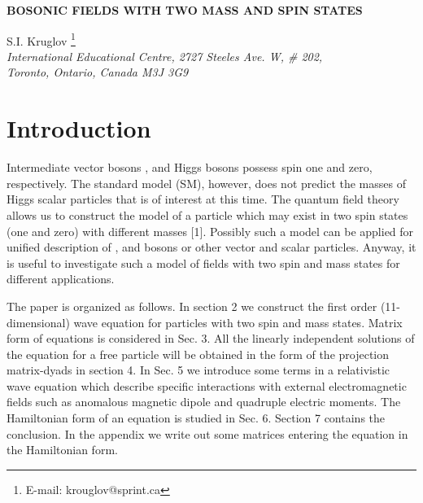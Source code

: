 \documentclass[a4paper,12pt]{article}
\begin{document}
\begin{center}
{\bf BOSONIC FIELDS WITH TWO MASS AND SPIN STATES}

\vspace{5mm}
 S.I. Kruglov \footnote{E-mail:
krouglov@sprint.ca}\\

\vspace{5mm}
\textit{International Educational Centre, 2727 Steeles Ave. W, \# 202, \\
Toronto, Ontario, Canada M3J 3G9}
\end{center}

\begin{abstract}
We consider the bosonic fields which describe a particle which may
exist in states with spins one and zero with different masses. All
the linearly independent solutions of the equation for a free
particle are obtained in the form of the projection matrix-dyads
(density-matrices). The interaction with anomalous magnetic dipole
and quadruple electric moments of a particle is studied. The
Hamiltonian form of the first order equation has been
investigated.
\end{abstract}

\section{Introduction}

Intermediate vector bosons \coordHE{}, \coordHE{} and Higgs \coordHE{} bosons
possess spin one and zero, respectively. The standard model (SM),
however, does not predict the masses of Higgs scalar particles
that is of interest at this time. The quantum field theory allows
us to construct the model of a particle which may exist in two
spin states (one and zero) with different masses [1]. Possibly
such a model can be applied for unified description of \coordHE{},
\coordHE{} and \coordHE{} bosons or other vector and scalar particles. Anyway,
it is useful to investigate such a model of fields with two spin
and mass states for different applications.

The paper is organized as follows. In section 2 we construct the
first order (11-dimensional) wave equation for particles with two
spin and mass states. Matrix form of equations is considered in
Sec. 3. All the linearly independent solutions of the equation for
a free particle will be obtained in the form of the projection
matrix-dyads in section 4. In Sec. 5 we introduce some terms in a
relativistic wave equation which describe specific interactions
with external electromagnetic fields such as anomalous magnetic
dipole and quadruple electric moments. The Hamiltonian form of an
equation is studied in Sec. 6. Section 7 contains the conclusion.
In the appendix we write out some matrices entering the equation
in the Hamiltonian form.
\end{document}
